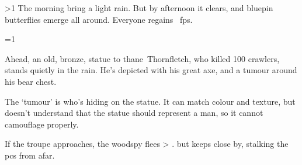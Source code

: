 \ifnum\value{temperature}>1
The morning bring a light rain.
But by afternoon it clears, and bluepin butterflies emerge all around.
Everyone regains ~\glspl{fp}.

\fi

\ifnum\value{cycle}=1%
  \begin{boxtext}
    Ahead, an old, bronze, statue to \gls{thane}~Thornfletch, who killed 100 \glspl{crawler}, stands quietly in the rain.
    He's depicted with his great axe, and a tumour around his bear chest.
  \end{boxtext}

  The `tumour' is  who's hiding on the statue.
  It can match colour and texture, but doesn't understand that the statue should represent a man, so it cannot camouflage properly.

  \woodspy

  If the troupe approaches, the \gls{woodspy} flees%
  \ifnum\value{r12}>\value{hp}%
    .
  \else%
    but keeps close by, stalking the \glspl{pc} from afar.
  \fi%
\fi
